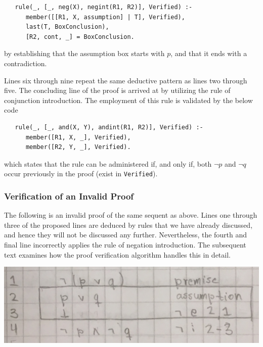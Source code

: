 \documentclass[a4paper, 11pt]{article}
\begin{document}
\begin{enumerate}
\begin{verbatim}
   rule(_, [_, neg(X), negint(R1, R2)], Verified) :-
      member([[R1, X, assumption] | T], Verified),
      last(T, BoxConclusion),
      [R2, cont, _] = BoxConclusion.
\end{verbatim}

            by establishing that the assumption box starts
            with $p$, and that it ends with a contradiction.
            \bigbreak

            Lines six through nine repeat the 
            same deductive pattern as lines two through five.
            The concluding line of the proof is arrived at by
            utilizing the rule of conjunction introduction.
            The employment of this rule is validated by the
            below code

\begin{verbatim}
   rule(_, [_, and(X, Y), andint(R1, R2)], Verified) :-
      member([R1, X, _], Verified),
      member([R2, Y, _], Verified).
\end{verbatim}

            which states that the rule can be administered if,
            and only if, both $\neg p$ and $\neg q$ occur
            previously in the proof (exist in
            \texttt{Verified}).

   \end{enumerate}

   \subsubsection{Verification of an Invalid Proof}
   
   The following is an invalid proof of the same sequent as
   above. Lines one through three of the proposed lines are 
   deduced by rules that we have already discussed, and hence 
   they will not be discussed any further. Nevertheless, the
   fourth and final line incorrectly applies the rule of
   negation introduction. The subsequent text examines how the
   proof verification algorithm handles this in detail.   

   \includegraphics[scale=0.25]{de-morgan-invalid}
   
\end{document}
